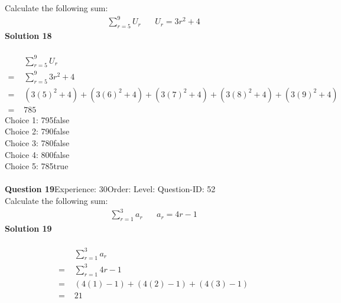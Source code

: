 \documentclass{article}
\begin{document}
Calculate the following sum:
\begin{align*}
\sum_{r=5}^{9} U_r \hspace{20pt}U_r=3r^2+4
\end{align*}
\noindent\textbf{Solution 18}\\[2pt]
\\[-35pt]\begin{align*}
&\sum_{r=5}^{9} U_r\\[2pt]
=\,\,&\sum_{r=5}^{9} 3r^2+4\\[2pt]
=\,\,&(3(5)^2+4)+(3(6)^2+4)+(3(7)^2+4)+(3(8)^2+4)+(3(9)^2+4) \\[2pt]
=\,\,&785
\end{align*}
Choice 1: \hspace{20pt}795\hspace{20pt}false\\
Choice 2: \hspace{20pt}790\hspace{20pt}false\\
Choice 3: \hspace{20pt}780\hspace{20pt}false\\
Choice 4: \hspace{20pt}800\hspace{20pt}false\\
Choice 5: \hspace{20pt}785\hspace{20pt}true\\
\\[4pt]
\noindent\textbf{Question 19}\hspace{20pt}Experience: 30\hspace{20pt}Order: \hspace{20pt}Level: \hspace{20pt}Question-ID: 52\\[2pt]
Calculate the following sum:
\begin{align*}
\sum_{r=1}^{3} a_r \hspace{20pt}a_r=4r-1
\end{align*}
\noindent\textbf{Solution 19}\\[2pt]
\\[-35pt]\begin{align*}
&\sum_{r=1}^{3} a_r\\[2pt]
=\,\,&\sum_{r=1}^{3} 4r-1\\[2pt]
=\,\,&(4(1)-1)+(4(2)-1)+(4(3)-1) \\[2pt]
=\,\,&21
\end{align*}
\end{document}
